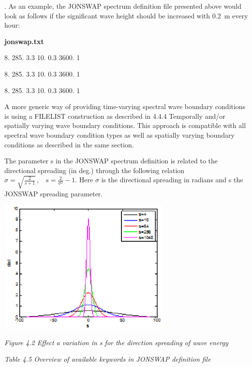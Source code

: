 \documentclass{article}
\begin{document}
\noindent . As an example, the JONSWAP spectrum definition file presented above would look as follows if the significant wave height should be increased with 0.2~m every hour:

\noindent \textbf{jonswap.txt}

 8. 285. 3.3 10. 0.3 3600. 1

 8. 285. 3.3 10. 0.3 3600. 1

 8. 285. 3.3 10. 0.3 3600. 1

\noindent A more generic way of providing time-varying spectral wave boundary conditions is using a FILELIST construction as described in 4.4.4 Temporally and/or spatially varying wave boundary conditions. This approach is compatible with all spectral wave boundary condition types as well as spatially varying boundary conditions as described in the same section.

\noindent The parameter s in the JONSWAP spectrum definition is related to the directional spreading (in deg.) through the following relation $\sigma =\sqrt{\frac{2}{s+1} } \, ,\, \, \, \, \, s=\frac{2}{\sigma ^{2} } -1$. Here\textit{ $\sigma $} is the directional spreading in radians and s the JONSWAP spreading parameter.

\noindent \textbf{\includegraphics*[width=3.42in, height=2.66in, keepaspectratio=false, trim=0.22in 0.15in 0.29in 0.13in]{image25}}

\noindent \textit{Figure 4.2 Effect a variation in s for the direction spreading of wave energy}

\noindent 

\noindent \textit{Table 4.5 Overview of available keywords in JONSWAP definition file}
\end{document}
